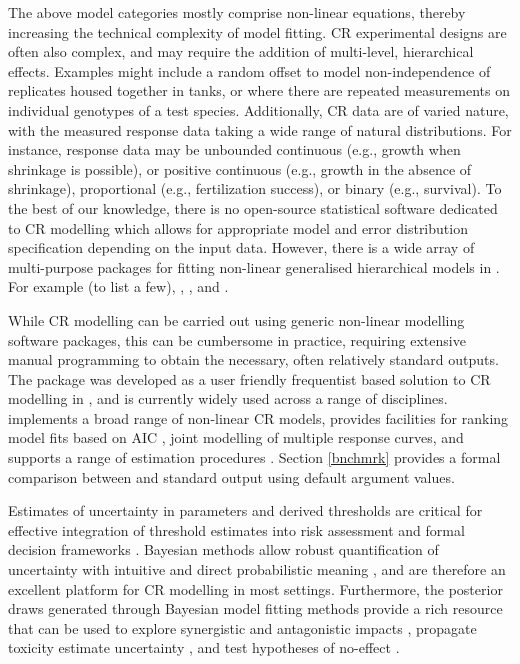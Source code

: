 \documentclass[
  shortnames]{jss}
\begin{document}
The above model categories mostly comprise non-linear equations, thereby increasing the technical complexity of model fitting. CR experimental designs are often also complex, and may require the addition of multi-level, hierarchical effects. Examples might include a random offset to model non-independence of replicates housed together in tanks, or where there are repeated measurements on individual genotypes of a test species. Additionally, CR data are of varied nature, with the measured response data taking a wide range of natural distributions. For instance, response data may be unbounded continuous (e.g., growth when shrinkage is possible), or positive continuous (e.g., growth in the absence of shrinkage), proportional (e.g., fertilization success), or binary (e.g., survival). To the best of our knowledge, there is no open-source statistical software dedicated to CR modelling which allows for appropriate model and error distribution specification depending on the input data. However, there is a wide array of multi-purpose packages for fitting non-linear generalised hierarchical models in . For example (to list a few),  \citep{pinheiro2021},  \citep{pinheiro2021},  \citep{Su2015} and  \citep{rstan2021}.

While CR modelling can be carried out using generic non-linear modelling software packages, this can be cumbersome in practice, requiring extensive manual programming to obtain the necessary, often relatively standard outputs. The  package \citep{Ritz2016} was developed as a user friendly frequentist based solution to CR modelling in , and is currently widely used across a range of disciplines.  implements a broad range of non-linear CR models, provides facilities for ranking model fits based on AIC \citep{Burnham2002}, joint modelling of multiple response curves, and supports a range of estimation procedures \citep{Ritz2016}. Section \ref{bnchmrk} provides a formal comparison between  and  standard output using default argument values.

Estimates of uncertainty in parameters and derived thresholds are critical for effective integration of threshold estimates into risk assessment and formal decision frameworks \citep{fisher2018c}. Bayesian methods allow robust quantification of uncertainty with intuitive and direct probabilistic meaning \citep{Ellison1996}, and are therefore an excellent platform for CR modelling in most settings. Furthermore, the posterior draws generated through Bayesian model fitting methods provide a rich resource that can be used to explore synergistic and antagonistic impacts \citep{Fisher2019d, flores2021}, propagate toxicity estimate uncertainty \citep{Charles2020a, Gottschalk2013}, and test hypotheses of no-effect \citep{Thomas2006}.
\end{document}
